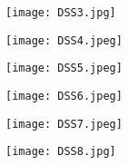 \documentclass[12pt, spanish]{article}
\begin{document}
\begin{centering}\texttt{[image: DSS3.jpg]}\\[1.0 cm]\end{centering}

\begin{centering}\texttt{[image: DSS4.jpeg]}\\[1.0 cm]\end{centering}

\begin{centering}\texttt{[image: DSS5.jpeg]}\\[1.0 cm]\end{centering}

\begin{centering}\texttt{[image: DSS6.jpeg]}\\[1.0 cm]\end{centering}

\begin{centering}\texttt{[image: DSS7.jpeg]}\\[1.0 cm]\end{centering}

\begin{centering}\texttt{[image: DSS8.jpg]}\\[1.0 cm]\end{centering}
\end{document}
